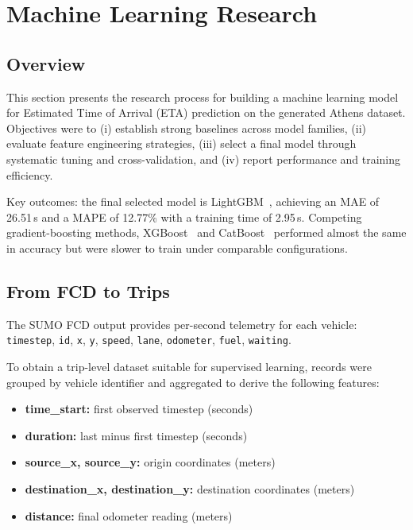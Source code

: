 \clearpage
\section{Machine Learning Research}

\subsection{Overview}
This section presents the research process for building a machine learning model for Estimated Time of Arrival (ETA) prediction on the generated Athens dataset. Objectives were to (i) establish strong baselines across model families, (ii) evaluate feature engineering strategies, (iii) select a final model through systematic tuning and cross-validation, and (iv) report performance and training efficiency.

Key outcomes: the final selected model is LightGBM~\cite{ke2017lightgbm}, achieving an MAE of 26.51\,s and a MAPE of 12.77\% with a training time of 2.95\,s.
Competing gradient-boosting methods, XGBoost~\cite{chen2016xgboost} and CatBoost~\cite{prokhorenkova2018catboost} performed almost the same in accuracy but were slower to train under comparable configurations.

\subsection{From FCD to Trips}
The SUMO FCD output provides per-second telemetry for each vehicle: \texttt{timestep}, \texttt{id}, \texttt{x}, \texttt{y}, \texttt{speed}, \texttt{lane}, \texttt{odometer}, \texttt{fuel}, \texttt{waiting}.

To obtain a trip-level dataset suitable for supervised learning, records were grouped by vehicle identifier and aggregated to derive the following features:

\begin{itemize}
    \item \textbf{time\_start:} first observed timestep (seconds)
    \item \textbf{duration:} last minus first timestep (seconds)
    \item \textbf{source\_x, source\_y:} origin coordinates (meters)
    \item \textbf{destination\_x, destination\_y:} destination coordinates (meters)
    \item \textbf{distance:} final odometer reading (meters)
\end{itemize}

